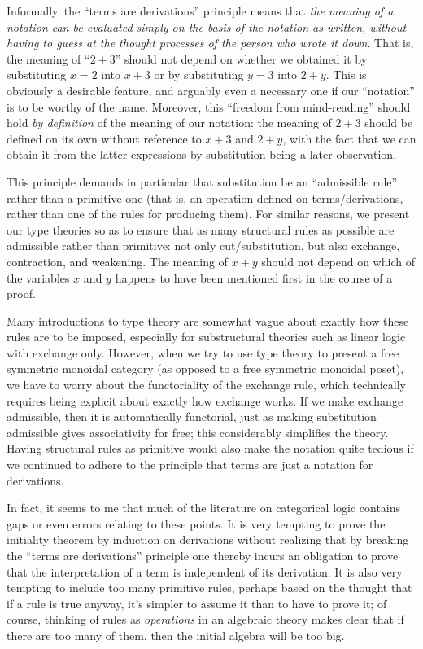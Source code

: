 Informally, the ``terms are derivations'' principle means that \emph{the meaning of a notation can be evaluated simply on the basis of the notation as written, without having to guess at the thought processes of the person who wrote it down}.
That is, the meaning of ``$2+3$'' should not depend on whether we obtained it by substituting $x=2$ into $x+3$ or by substituting $y=3$ into $2+y$.
This is obviously a desirable feature, and arguably even a necessary one if our ``notation'' is to be worthy of the name.
Moreover, this ``freedom from mind-reading'' should hold \emph{by definition} of the meaning of our notation: the meaning of $2+3$ should be defined on its own without reference to $x+3$ and $2+y$, with the fact that we can obtain it from the latter expressions by substitution being a later observation.

This principle demands in particular that substitution be an ``admissible rule'' rather than a primitive one (that is, an operation defined on terms/derivations, rather than one of the rules for producing them).
For similar reasons, we present our type theories so as to ensure that as many structural rules as possible are admissible rather than primitive: not only cut/substitution, but also exchange, contraction, and weakening.
The meaning of $x+y$ should not depend on which of the variables $x$ and $y$ happens to have been mentioned first in the course of a proof.

Many introductions to type theory are somewhat vague about exactly how these rules are to be imposed, especially for substructural theories such as linear logic with exchange only.
However, when we try to use type theory to present a free symmetric monoidal category (as opposed to a free symmetric monoidal poset), we have to worry about the functoriality of the exchange rule, which technically requires being explicit about exactly how exchange works.
If we make exchange admissible, then it is automatically functorial, just as making substitution admissible gives associativity for free; this considerably simplifies the theory.
Having structural rules as primitive would also make the notation quite tedious if we continued to adhere to the principle that terms are just a notation for derivations.

In fact, it seems to me that much of the literature on categorical logic contains gaps or even errors relating to these points.
It is very tempting to prove the initiality theorem by induction on derivations without realizing that by breaking the ``terms are derivations'' principle one thereby incurs an obligation to prove that the interpretation of a term is independent of its derivation.
It is also very tempting to include too many primitive rules, perhaps based on the thought that if a rule is true anyway, it's simpler to assume it than to have to prove it; of course, thinking of rules as \emph{operations} in an algebraic theory makes clear that if there are too many of them, then the initial algebra will be too big.

